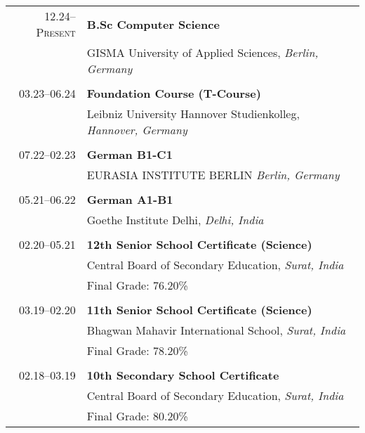 \documentclass[12pt,a4paper]{moderncv}
\begin{document}
\begin{tabular}{r l}	
    \textsc{12.24}--\textsc{Present} \hspace{0.5em} 
        & \textbf{B.Sc Computer Science} \\
        & GISMA University of Applied Sciences, \textit{Berlin, Germany} \\
        & \\  %
        
    \textsc{03.23}--\textsc{06.24} \hspace{0.5em} 
        & \textbf{Foundation Course (T-Course)} \\
        & Leibniz University Hannover Studienkolleg, \textit{Hannover, Germany} \\
        & \\  %

    \textsc{07.22}--\textsc{02.23} \hspace{0.5em} 
        & \textbf{German B1-C1} \\
        & EURASIA INSTITUTE BERLIN \textit{Berlin, Germany} \\
        & \\  %

    \textsc{05.21}--\textsc{06.22} \hspace{0.5em} 
        & \textbf{German A1-B1} \\
        & Goethe Institute Delhi, \textit{Delhi, India} \\
        & \\  %
        
    \textsc{02.20}--\textsc{05.21} \hspace{0.5em} 
        & \textbf{12th Senior School Certificate (Science)} \\
        & Central Board of Secondary Education, \textit{Surat, India} \\
        & Final Grade: 76.20\% \\
        & \\  %
        
    \textsc{03.19}--\textsc{02.20} \hspace{0.5em} 
        & \textbf{11th Senior School Certificate (Science)} \\
        & Bhagwan Mahavir International School, \textit{Surat, India} \\
        & Final Grade: 78.20\% \\
        & \\  %
        
    \textsc{02.18}--\textsc{03.19} \hspace{0.5em} 
        & \textbf{10th Secondary School Certificate} \\ 
        & Central Board of Secondary Education, \textit{Surat, India} \\
        & Final Grade: 80.20\% \\
\end{tabular}
\end{document}
